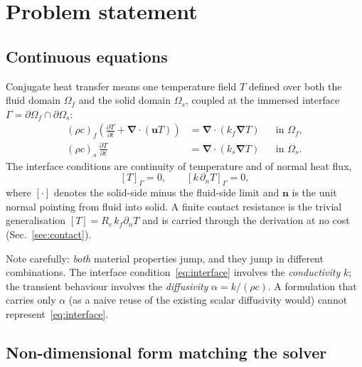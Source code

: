 \documentclass[11pt,a4paper]{article}
\newcommand{\jump}[1]{\left[#1\right]}
\newcommand{\nn}{\boldsymbol{n}}
\newcommand{\grad}{\boldsymbol{\nabla}}
\begin{document}
\tableofcontents

\section{Problem statement}

\subsection{Continuous equations}

Conjugate heat transfer means one temperature field $T$ defined over both the
fluid domain $\Omega_f$ and the solid domain $\Omega_s$, coupled at the immersed
interface $\Gamma=\partial\Omega_f\cap\partial\Omega_s$:
\begin{align}
  (\rho c)_f\left(\frac{\partial T}{\partial t}+\grad\!\cdot(\boldsymbol{u}T)\right)
    &= \grad\!\cdot\!\left(k_f\grad T\right) && \text{in }\Omega_f, \label{eq:fluid}\\
  (\rho c)_s\,\frac{\partial T}{\partial t}
    &= \grad\!\cdot\!\left(k_s\grad T\right) && \text{in }\Omega_s. \label{eq:solid}
\end{align}
The interface conditions are continuity of temperature and of normal heat flux,
\begin{equation}
  \jump{T}_\Gamma = 0,
  \qquad
  \jump{k\,\partial_n T}_\Gamma = 0,
  \label{eq:interface}
\end{equation}
where $\jump{\cdot}$ denotes the solid-side minus the fluid-side limit and
$\nn$ is the unit normal pointing from fluid into solid. A finite contact
resistance is the trivial generalisation $\jump{T}=R_c\,k_f\partial_nT$ and is
carried through the derivation at no cost (Sec.~\ref{sec:contact}).

Note carefully: \emph{both} material properties jump, and they jump in different
combinations. The interface condition~\eqref{eq:interface} involves the
\emph{conductivity} $k$; the transient behaviour involves the \emph{diffusivity}
$\alpha=k/(\rho c)$. A formulation that carries only $\alpha$ (as a naive reuse
of the existing scalar diffusivity would) cannot represent~\eqref{eq:interface}.

\subsection{Non-dimensional form matching the solver}
\end{document}
